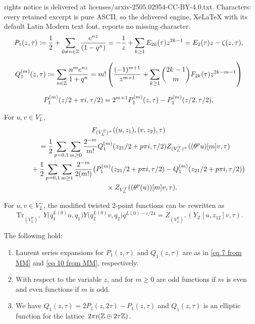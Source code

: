 \documentclass[10pt,a4paper]{amsart}
\begin{document}
rights notice is delivered at licenses/arxiv-2505.02954-CC-BY-4.0.txt. Characters: every retained excerpt is pure ASCII, so the delivered engine, XeLaTeX with its default Latin Modern text font, reports no missing character.
\begin{equation}\label{eq 7 from MM}
 P_1(z,\tau)\coloneqq \frac{1}{2}+\sum_{0\neq n\in \mathbb{Z}}\frac{{\rm e}^{nz}}{(1-q^n)}=-\frac{1}{z}+\sum_{k\geq 1}E_{2k}(\tau)z^{2k-1}=E_{2}(\tau)z-\zeta(z,\tau),
\end{equation}

\begin{gather}
 Q_1^{(m)}(z,\tau)\coloneqq \sum_{n\in \mathbb{Z}}\frac{n^m{\rm e}^{nz}}{1+q^n}=m!\left( \frac{(-1)^{m+1}}{z^{m+1}}+\sum_{k\geq 1}\binom{2k-1}{m}F_{2k}(\tau)z^{2k-m-1} \right)\label{eq 10 from MM}
\end{gather}

\begin{gather}\label{P_1 translation}
 P_1^{(m)}(z/2+\pi {\rm i},\tau/2)=2^{m+1}P_1^{(m)}(z,\tau)-P_1^{(m)}(z/2,\tau/2),
\end{gather}

\begin{Theorem}\label{Z2 Twisted+ Reduction Theorem 1}
 For $u,v\in V_L^-$,
 \begin{gather*}
 F_{(V_L^T)^+}((u,z_1),(v,z_2),\tau)\\
 \qquad=\frac{1}{2}\sum_{p=0,1}\sum_{m\geq 0}\frac{2^{-m}}{m!} Q_1^{(m)}(z_{21}/2+p\pi {\rm i},\tau/2) Z_{(V_L^T)^+}((\theta^pu)[m]v,\tau)\\
 \phantom{\qquad=}{}+\frac{1}{2}\sum_{p=0,1}\sum_{m\geq 1}\frac{2^{-m}}{2(m!)}\bigl( P_1^{(m)}(z_{21}/2+p\pi {\rm i},\tau/2)-Q_1^{(m)}(z_{21}/2+p\pi {\rm i},\tau/2)\bigr) \\
 \phantom{\qquad=+}{}\times Z_{V_L^T}((\theta^p(u))[m]v, \tau).
 \end{gather*}
\end{Theorem}

\begin{Theorem}\label{Z2 Twisted+- Reduction Theorem 2}
 For $u,v\in V_L^-$, the modified twisted $2$-point functions can be rewritten as
 \[\operatorname{Tr}_{(V_L^T)^+}Y\bigl(q_1^{L(0)}u,q_1\bigr)Y\bigl(q_2^{L(0)}v,q_2\bigr)q^{L(0)-c/24}=Z_{(V_L^T)^+}(Y_{\mathbb{Z}}[u,z_{12}]v,\tau).\]
\end{Theorem}

\begin{Lemma}\label{Lemma 3 from MM}
 The following hold:
\begin{enumerate}\itemsep=0pt
\item[$(1)$] Laurent series expansions for $P_1(z,\tau)$ and $Q_1(z,\tau)$ are as in \eqref{eq 7 from MM} and \eqref{eq 10 from MM}, respectively.
\item[$(2)$] With respect to the variable $z$,  and  for $m\geq 0$ are odd functions if $m$ is even and even functions if $m$ is odd.
\item[$(3)$] We have $Q_1(z,\tau)=2P_1(z,2\tau)-P_1(z,\tau)$ and $Q_1(z,\tau)$ is an elliptic function for the lattice~${2\pi {\rm i}(\mathbb{Z}\oplus 2\tau\mathbb{Z})}$.
 \end{enumerate}
\end{Lemma}
\end{document}
